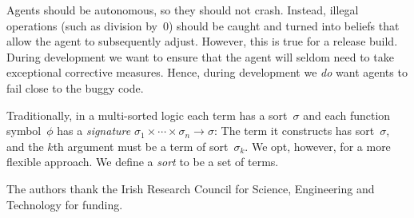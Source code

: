 \documentclass[preprint]{sigplanconf} %
\begin{document}
Agents should be autonomous, so they should not crash. Instead, illegal
operations (such as division by~$0$) should be caught and turned into
beliefs that allow the agent to subsequently adjust. However, this is true
for a release build. During development we want to ensure that the agent
will seldom need to take exceptional corrective measures. Hence, during
development we \emph{do} want agents to fail close to the buggy code.

Traditionally, in a multi-sorted logic each term has a sort~$\sigma$ and
each function symbol~$\phi$ has a \emph{signature}
$\sigma_1\times\cdots\times\sigma_n\to\sigma$: The term it constructs has
sort~$\sigma$, and the $k$th argument must be a term of sort~$\sigma_k$. We
opt, however, for a more flexible approach. We define a \emph{sort} to be a
set of terms.

\acks

The authors thank the Irish Research Council for Science, Engineering and
Technology for funding.




\end{document}
